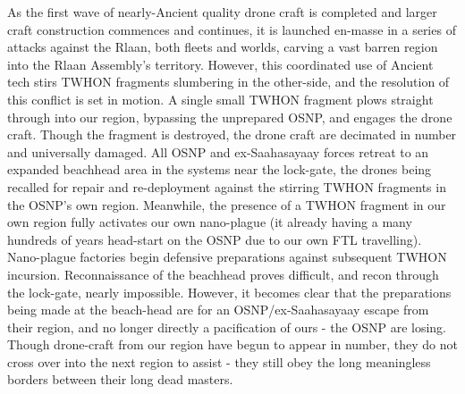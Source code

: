As the first wave of nearly-Ancient quality drone craft is completed
and larger craft construction commences and continues, it is launched
en-masse in a series of attacks against the Rlaan, both fleets and
worlds, carving a vast barren region into the Rlaan Assembly's
territory. However, this coordinated use of Ancient tech stirs TWHON
fragments slumbering in the other-side, and the resolution of this
conflict is set in motion. A single small TWHON fragment plows
straight through into our region, bypassing the unprepared OSNP, and
engages the drone craft. Though the fragment is destroyed, the drone
craft are decimated in number and universally damaged. All OSNP and
ex-Saahasayaay forces retreat to an expanded beachhead area in the
systems near the lock-gate, the drones being recalled for repair and
re-deployment against the stirring TWHON fragments in the OSNP's own
region. Meanwhile, the presence of a TWHON fragment in our own region
fully activates our own nano-plague (it already having a many hundreds
of years head-start on the OSNP due to our own FTL
travelling). Nano-plague factories begin defensive preparations
against subsequent TWHON incursion. Reconnaissance of the beachhead
proves difficult, and recon through the lock-gate, nearly
impossible. However, it becomes clear that the preparations being made
at the beach-head are for an OSNP/ex-Saahasayaay escape from their
region, and no longer directly a pacification of ours - the OSNP are
losing. Though drone-craft from our region have begun to appear in
number, they do not cross over into the next region to assist - they
still obey the long meaningless borders between their long dead
masters.


